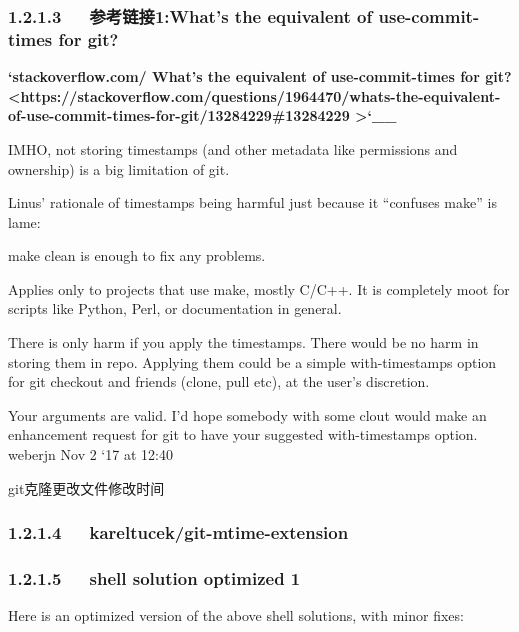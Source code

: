 \documentclass[letterpaper,12pt,english]{sphinxmanual}
\begin{document}
\subsubsection{1.2.1.3   参考链接1:What’s the equivalent of use-commit-times for git?}
\label{\detokenize{001software/001install/001._u7f51_u7ad9/github:what-s-the-equivalent-of-use-commit-times-for-git}}
{\color{red}\bfseries{}{}`stackoverflow.com/ What's the equivalent of use-commit-times for git? \textless{}https://stackoverflow.com/questions/1964470/whats-the-equivalent-of-use-commit-times-for-git/13284229\#13284229
\textgreater{}{}`\_\_}

IMHO, not storing timestamps (and other metadata like permissions and ownership) is a big limitation of git.

Linus’ rationale of timestamps being harmful just because it “confuses make” is lame:

make clean is enough to fix any problems.

Applies only to projects that use make, mostly C/C++. It is completely moot for scripts like Python, Perl, or documentation in general.

There is only harm if you apply the timestamps. There would be no harm in storing them in repo. Applying them could be a simple \textendash{}with-timestamps option for git checkout and friends (clone, pull etc), at the user’s discretion.

Your arguments are valid. I’d hope somebody with some clout would make an enhancement request for git to have your suggested \textendash{}with-timestamps option. \textendash{} weberjn Nov 2 ‘17 at 12:40

git克隆更改文件修改时间



\subsubsection{1.2.1.4   kareltucek/git-mtime-extension}
\label{\detokenize{001software/001install/001._u7f51_u7ad9/github:kareltucek-git-mtime-extension}}


\subsubsection{1.2.1.5   shell solution optimized 1}
\label{\detokenize{001software/001install/001._u7f51_u7ad9/github:shell-solution-optimized-1}}
Here is an optimized version of the above shell solutions, with minor fixes:
\end{document}
